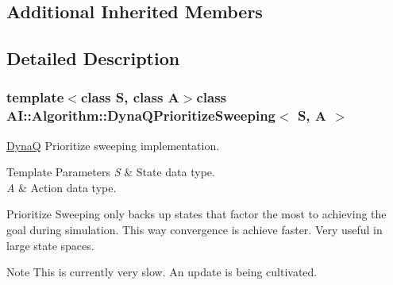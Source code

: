 \subsection*{Additional Inherited Members}


\subsection{Detailed Description}
\subsubsection*{template$<$class S, class A$>$class A\+I\+::\+Algorithm\+::\+Dyna\+Q\+Prioritize\+Sweeping$<$ S, A $>$}

\hyperlink{classAI_1_1Algorithm_1_1DynaQ}{Dyna\+Q} Prioritize sweeping implementation. 


\begin{DoxyTemplParams}{Template Parameters}
{\em S} & State data type. \\
\hline
{\em A} & Action data type.\\
\hline
\end{DoxyTemplParams}
Prioritize Sweeping only backs up states that factor the most to achieving the goal during simulation. This way convergence is achieve faster. Very useful in large state spaces.

\begin{DoxyNote}{Note}
This is currently very slow. An update is being cultivated. 
\end{DoxyNote}


